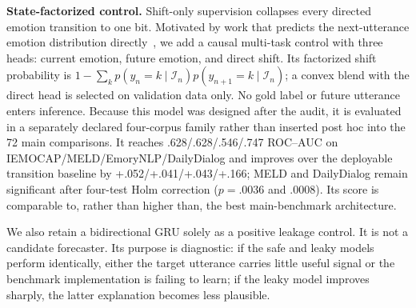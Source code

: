 \documentclass{ieeeaccess}
\begin{document}
\textbf{State-factorized control.} Shift-only supervision collapses every directed emotion
transition to one bit. Motivated by work that predicts the next-utterance emotion distribution
directly~\cite{lu2023edfc}, we add a causal multi-task control with three heads: current emotion,
future emotion, and direct shift. Its factorized shift probability is
$1-\sum_k p(y_n{=}k\mid\mathcal I_n)p(y_{n+1}{=}k\mid\mathcal I_n)$; a convex blend with the
direct head is selected on validation data only. No gold label or future utterance enters inference.
Because this model was designed after the audit, it is evaluated in a separately declared
four-corpus family rather than inserted post hoc into the 72 main comparisons. It reaches
.628/.628/.546/.747 ROC--AUC on IEMOCAP/MELD/EmoryNLP/DailyDialog and improves over the deployable
transition baseline by +.052/+.041/+.043/+.166; MELD and DailyDialog remain significant after
four-test Holm correction ($p=.0036$ and $.0008$). Its score is comparable to, rather than higher
than, the best main-benchmark architecture.

We also retain a bidirectional GRU solely as a positive leakage control. It is not a candidate
forecaster. Its purpose is diagnostic: if the safe and leaky models perform identically, either the
target utterance carries little useful signal or the benchmark implementation is failing to learn;
if the leaky model improves sharply, the latter explanation becomes less plausible.

\begin{table}[t]
\centering
\footnotesize
\caption{Dataset statistics and F1 degeneracy. Always-shift F1 $=2r/(1{+}r)$ for shift rate $r$
(analytic; always-shift balanced accuracy is 0.500 by construction, omitted). Transition-BA
$\approx$0.50 on MELD/EmoryNLP/IEMOCAP-mm shows standard F1 sits at the degenerate ceiling on
exactly the corpora where shift is common; only IEMOCAP and DailyDialog clear it.}
\label{tab:stats}
\end{table}
\end{document}
